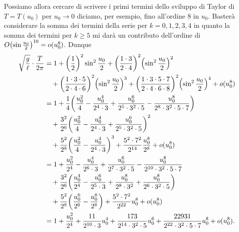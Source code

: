 \begin{example}
Possiamo allora cercare di scrivere i primi termini dello sviluppo di
Taylor di $T = T(u_0)$ per $u_0\to 0$ diciamo, per esempio, fino all'ordine 8
in $u_0$. Basterà considerare la somma dei termini della
serie per $k=0,1,2,3,4$ in quanto la somma dei termini per $k\ge 5$ mi darà
 un contributo dell'ordine di $O{\left( \sin \frac {u_0} 2 \right)}^{10} = o(u_0^8)$. Dunque
 \begin{align*}
 \sqrt{\frac{g}{\ell}}\cdot \frac{T}{2\pi}
 &=
 1 + \enclose{\frac 1 2}^2 \sin^2 \frac{u_0} 2
 + \enclose{\frac{1\cdot 3}{2\cdot 4}}^2\enclose{\sin^2 \frac {u_0} 2}^2 \\
 &\quad + \enclose{\frac{1\cdot 3 \cdot 5}{2\cdot 4 \cdot 6}}^2
 \enclose{\sin^2 \frac {u_0} 2}^3 + \enclose{\frac{1\cdot 3\cdot 5 \cdot 7}{2\cdot 4\cdot 6\cdot 8}}^2
 \enclose{\sin^2 \frac {u_0} 2}^4 + o(u_0^8) \\
 &=
1 + \frac 1 4 \enclose{\frac{u_0^2}{4} - \frac{u_0^4}{2^4\cdot 3} + \frac{u_0^6}{2^5\cdot 3^2\cdot 5}
- \frac{u_0^8}{2^8\cdot 3^2\cdot 5\cdot 7}} \\
&\quad + \frac{3^2}{2^6}\enclose{\frac{u_0^2}{4} - \frac{u_0^4}{2^4\cdot 3}
+ \frac{u_0^6}{2^5\cdot 3^2\cdot 5}}^2\\
&\quad + \frac{5^2}{2^8}\enclose{\frac{u_0^2}{4} - \frac{u_0^4}{2^4\cdot 3}}^3
+ \frac{5^2\cdot 7^2}{2^{14}}
\frac {u_0^8} {2^8} + o(u_0^8)\\
%
&=
1 + \frac{u_0^2}{2^4} - \frac{u_0^4}{2^6\cdot 3} + \frac{u_0^6}{2^7\cdot 3^2\cdot 5}
- \frac{u_0^8}{2^{10}\cdot 3^2\cdot 5\cdot 7} \\
&\quad + \frac{3^2}{2^6}\enclose{\frac{u_0^4}{2^4} - \frac{u_0^6}{2^5\cdot 3} + \frac{u_0^8}{2^8\cdot 3^2} + \frac{u_0^8}{2^6\cdot 3^2\cdot 5}}\\
&\quad + \frac{5^2}{2^8}\enclose{\frac{u_0^6}{2^6} - \frac{u_0^8}{2^8}}
+ \frac{5^2\cdot 7^2}{2^{22}}
u_0^8 + o(u_0^8)\\
%
&= 1 + \frac{u_0^2}{2^4} + \frac{11}{2^{10}\cdot 3} u_0^4
 + \frac{173}{2^{14}\cdot 3^2\cdot 5} u_0^6
 + \frac{22931}{2^{22}\cdot 3^2\cdot 5\cdot 7} u_0^8
 + o(u_0^8).\\
\end{align*}

\end{example}

